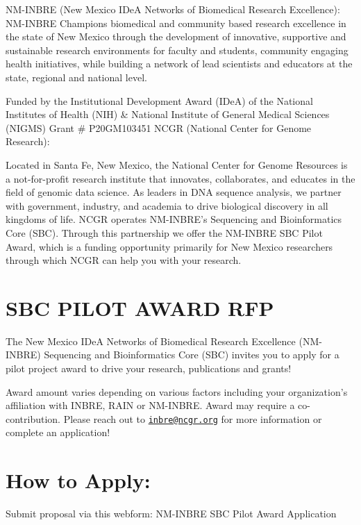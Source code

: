 \documentclass[
]{book}
\begin{document}
NM-INBRE (New Mexico IDeA Networks of Biomedical Research Excellence):
NM-INBRE Champions biomedical and community based research excellence in the state of New Mexico through the development of innovative, supportive and sustainable research environments for faculty and students, community engaging health initiatives, while building a network of lead scientists and educators at the state, regional and national level.

Funded by the Institutional Development Award (IDeA) of the National Institutes of Health (NIH) \& National Institute of General Medical Sciences (NIGMS) Grant \# P20GM103451
NCGR (National Center for Genome Research):

Located in Santa Fe, New Mexico, the National Center for Genome Resources is a not-for-profit research institute that innovates, collaborates, and educates in the field of genomic data science. As leaders in DNA sequence analysis, we partner with government, industry, and academia to drive biological discovery in all kingdoms of life.
NCGR operates NM-INBRE's Sequencing and Bioinformatics Core (SBC). Through this partnership we offer the NM-INBRE SBC Pilot Award, which is a funding opportunity primarily for New Mexico researchers through which NCGR can help you with your research.

\hypertarget{sbc-pilot-award-rfp}{%
\section*{SBC PILOT AWARD RFP}\label{sbc-pilot-award-rfp}}

The New Mexico IDeA Networks of Biomedical Research Excellence (NM-INBRE) Sequencing and Bioinformatics Core (SBC) invites you to apply for a pilot project award to drive your research, publications and grants!

Award amount varies depending on various factors including your organization's affiliation with INBRE, RAIN or NM-INBRE. Award may require a co-contribution. Please reach out to \href{mailto:inbre@ncgr.org}{\nolinkurl{inbre@ncgr.org}} for more information or complete an application!

\hypertarget{how-to-apply}{%
\section*{How to Apply:}\label{how-to-apply}}

Submit proposal via this webform: NM-INBRE SBC Pilot Award Application\hspace{0pt}\hspace{0pt}
\end{document}
